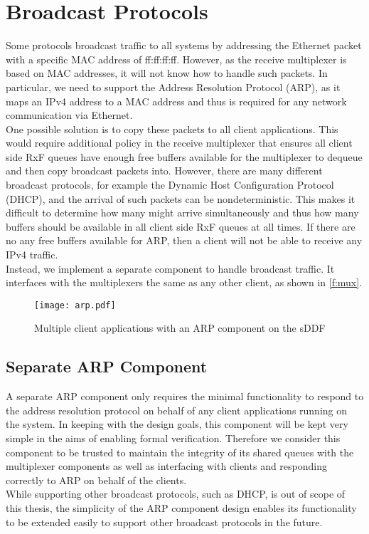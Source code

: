 \section{Broadcast Protocols}
Some protocols broadcast traffic to all systems by addressing the
Ethernet packet with a specific MAC address of ff:ff:ff:ff. However,
as the receive multiplexer is based on MAC addresses, it will not
know how to handle such packets. In particular, we need to support 
the Address Resolution Protocol (ARP), as it maps an
IPv4 address to a MAC address and thus 
is required for any network communication via Ethernet.\\
One possible solution is to copy these packets to all client applications.
This would require additional policy in the receive multiplexer that ensures
all client side RxF queues have enough free buffers available
for the multiplexer to dequeue and then copy broadcast packets into.
However, there are many different broadcast protocols, for example the Dynamic
Host Configuration Protocol (DHCP), and the arrival of such packets
can be nondeterministic. This makes it difficult to determine how many might arrive
simultaneously and thus how many buffers should be available in all client side
RxF queues at all times. If there are no any free buffers available for ARP, then
a client will not be able to receive any IPv4 traffic.\\
Instead, we implement a separate component to handle broadcast traffic. It interfaces
with the multiplexers the same as any other client, as shown in \autoref{f:mux}. 

\begin{figure}[h]
    \centering
    \texttt{[image: arp.pdf]}
    \caption{Multiple client applications with an ARP component on the sDDF}
    \label{f:arp}
\end{figure}

\subsection{Separate ARP Component}
A separate ARP component only requires the minimal functionality to respond to 
the address resolution protocol on behalf of any client applications running on
the system. In keeping with the design goals, this component will be kept 
very simple in the aims of enabling formal verification. Therefore we consider
this component to be trusted to maintain the integrity of its shared queues with
the multiplexer components as well as interfacing with clients and responding
correctly to ARP on behalf of the clients. \\
While supporting other broadcast protocols, such as DHCP, is out of scope of this thesis, 
the simplicity of the ARP component design enables its functionality to be extended easily
to support other broadcast protocols in the future.

